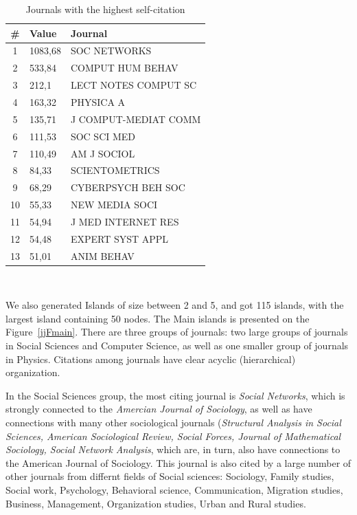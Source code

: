 \documentclass[11pt]{article} %
\begin{document}
\begin{table}
\caption{Journals with the highest self-citation} \label{jselfcite}\medskip
\renewcommand{\arraystretch}{0.95}
\small
\begin{center}
\begin{tabular}{c|l|l} 
\# &	Value&	Journal  \\  \hline 
1&	1083,68&	SOC NETWORKS\\
2&	533,84&	COMPUT HUM BEHAV \\
3&	212,1&	LECT NOTES COMPUT SC \\
4&	163,32&	PHYSICA A\\
5&	135,71&	J COMPUT-MEDIAT COMM\\
6&	111,53&	SOC SCI MED\\
7&	110,49&	AM J SOCIOL\\
8&	84,33&	SCIENTOMETRICS\\
9&	68,29&	CYBERPSYCH BEH SOC \\
10&	55,33&	NEW MEDIA SOCI\\
11&	54,94&	J MED INTERNET RES\\
12&	54,48&	EXPERT SYST APPL\\
13&	51,01&	ANIM BEHAV\\ \hline 
\end{tabular} \\ 
\end{center}
\end{table}  

We also generated Islands of size between 2 and 5, and got 115 islands, with the largest island containing 50 nodes. The Main islands is presented on the Figure~\ref{jjFmain}. There are three groups of journals: two large groups of journals in Social Sciences and Computer Science, as well as one smaller group of journals in Physics. Citations among journals have clear acyclic (hierarchical) organization. \medskip 

In the Social Sciences group, the most citing journal is \textit{Social Networks}, which is strongly connected to the \textit{Amercian Journal of Sociology}, as well as have connections with many other sociological journals (\textit{Structural Analysis in Social Sciences, American Sociological Review, Social Forces, Journal of Mathematical Sociology, Social Network Analysis}, which are, in turn, also have connections to the American Journal of Sociology. This journal is also cited by a large number of other journals from differnt fields of Social sciences: Sociology, Family studies, Social work, Psychology, Behavioral science, Communication, Migration studies, Business, Management, Organization studies, Urban and Rural studies. \medskip 
\end{document}
